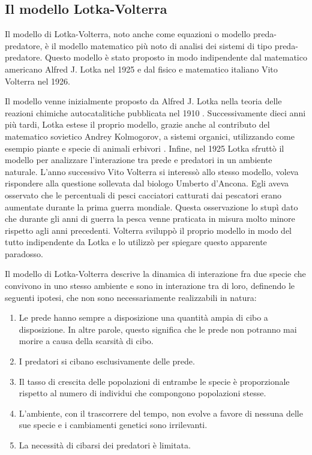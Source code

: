 \documentclass[11pt]{article}
\begin{document}
\subsection{Il modello Lotka-Volterra}
\label{sec:LV}
Il modello di Lotka-Volterra, noto anche come equazioni o modello preda-predatore, è il modello matematico più noto di analisi dei sistemi di tipo preda-predatore. Questo modello è stato proposto in modo indipendente dal matematico americano Alfred J. Lotka nel 1925 e dal fisico e matematico italiano Vito Volterra nel 1926. 

Il modello venne inizialmente proposto da Alfred J. Lotka nella teoria delle reazioni chimiche autocatalitiche pubblicata nel 1910 \cite{Goel}. Successivamente dieci anni più tardi, Lotka estese il proprio modello, grazie anche al contributo del matematico sovietico Andrey Kolmogorov, a sistemi organici, utilizzando come esempio piante e specie di animali erbivori \cite{Lotka1920}. Infine, nel 1925 Lotka sfruttò il modello per analizzare l'interazione tra prede e predatori in un ambiente naturale\cite{Lotka1925}. L'anno successivo Vito Volterra si interessò allo stesso modello, voleva rispondere alla questione sollevata dal biologo Umberto d'Ancona\cite{Bacaer}. Egli aveva osservato che le percentuali di pesci cacciatori catturati dai pescatori erano aumentate durante la prima guerra mondiale. Questa osservazione lo stupì dato che durante gli anni di guerra la pesca venne praticata in misura molto minore rispetto agli anni precedenti. Volterra sviluppò il proprio modello in modo del tutto indipendente da Lotka e lo utilizzò per spiegare questo apparente paradosso. 

Il modello di Lotka-Volterra\cite{Artioli} descrive la dinamica di interazione fra due specie che convivono in uno stesso ambiente e sono in interazione tra di loro, definendo le seguenti ipotesi, che non sono necessariamente realizzabili in natura: 
\begin{enumerate}
    \item Le prede hanno sempre a disposizione una quantità ampia di cibo a disposizione. In altre parole, questo significa che le prede non potranno mai morire a causa della scarsità di cibo. 
    \item I predatori si cibano esclusivamente delle prede. 
    \item Il tasso di crescita delle popolazioni di entrambe le specie è proporzionale rispetto al numero di individui che compongono popolazioni stesse.
    \item L'ambiente, con il trascorrere del tempo, non evolve a favore di nessuna delle sue specie e i cambiamenti genetici sono irrilevanti. 
    \item La necessità di cibarsi dei predatori è limitata. 
\end{enumerate}
\end{document}

